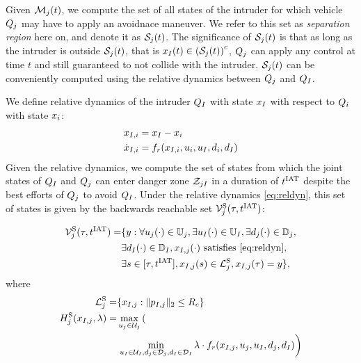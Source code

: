 Given $\mathcal{M}_j(t)$, we compute the set of all states of the intruder for which vehicle $Q_j$ may have to apply an avoidnace maneuver. We refer to this set as \textit{separation region} here on, and denote it as $\mathcal{S}_j(t)$. The significance of $\mathcal{S}_j(t)$ is that as long as the intruder is outside $\mathcal{S}_j(t)$, that is $x_{I}(t) \in \left(\mathcal{S}_j(t)\right)^c$, $Q_j$ can apply any control at time $t$ and still guaranteed to not collide with the intruder. $\mathcal{S}_j(t)$ can be conveniently computed using the relative dynamics between $Q_j$ and $Q_{I}$. 

We define relative dynamics of the intruder $Q_{I}$ with state $x_I$ with respect to $Q_i$ with state $x_i$:
\begin{equation}
\label{eq:reldyn}
\begin{aligned}
\state_{\intr, i} &= \state_\intr - \state_i \\
\dot \state_{\intr, i} &= f_r(\state_{\intr, i}, \ctrl_i, \ctrl_\intr, \dstb_i, \dstb_\intr)
\end{aligned}
\end{equation}
Given the relative dynamics, we compute the set of states from which the joint states of $Q_{I}$ and $Q_{j}$ can enter danger zone $\mathcal{Z}_{jI}$ in a duration of $t^\text{IAT}$ despite the best efforts of $Q_j$ to avoid $Q_{I}$. Under the relative dynamics \eqref{eq:reldyn}, this set of states is given by the backwards reachable set $\mathcal{V}^{\text{S}}_j(\tau, t^\text{IAT})$:

\begin{equation} \label{eqn:sepBRS}
\begin{aligned}
\brs^{\text{S}}_{j}(\tau, \iat) = & \{y: \forall \ctrl_j(\cdot) \in \cfset_j, \exists \ctrl_\intr(\cdot) \in \cfset_\intr, \exists \dstb_j(\cdot) \in \dfset_j, \\
& \exists \dstb_\intr(\cdot) \in \dfset_\intr, \state_{\intr, j}(\cdot) \text{ satisfies \eqref{eq:reldyn}},\\
& \exists s \in [\tau, \iat], \state_{\intr, j}(s) \in \targetset^{\text{S}}_{j}, \state_{\intr, j}(\tau) = y\},
\end{aligned}
\end{equation}
where 
\begin{equation}
\begin{aligned}
\mathcal{L}^{\text{S}}_{j} = & \{x_{I, j}: \|p_{I, j}\|_2 \le R_c\} \\
H^{\text{S}}_{j}(x_{I, j}, \lambda) = & \max_{u_j \in \mathcal{U}_j} \left( \right.\\
&\left. \min_{u_I \in \mathcal{U}_I, d_j \in \mathcal{D}_j, d_I \in \mathcal{D}_I} \lambda \cdot f_r(x_{I, j}, u_j, u_I, d_j, d_I) \right)
\end{aligned}
\end{equation}

